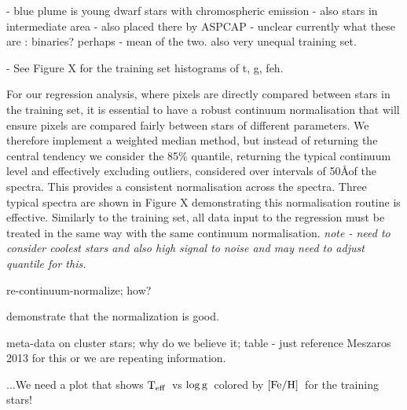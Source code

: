 \documentclass[12pt, preprint]{aastex}
\newcommand{\teff}{\mbox{$\rm T_{eff}$}}
\newcommand{\feh}{\mbox{$\rm [Fe/H]$}}
\newcommand{\logg}{\mbox{$\rm \log g$}}
\begin{document}
- blue plume is young dwarf stars with chromospheric emission
- also stars in intermediate area - also placed there by ASPCAP - unclear currently what these are : binaries? perhaps - mean of the two. also very unequal training set. 

- See Figure X for the training set histograms of t, g, feh. 

For our regression analysis, where pixels are directly compared between stars in the training set, it is essential to have a robust continuum normalisation that will ensure pixels are compared fairly between stars of different parameters. We therefore implement a weighted median method, but instead of returning the central tendency we consider the 85\% quantile, returning the typical continuum level and effectively excluding outliers, considered over intervals of 50\AA of the spectra. This provides a consistent normalisation across the spectra. Three typical spectra are shown in Figure X demonstrating this normalisation routine is effective. Similarly to the training set, all data input to the regression must be treated in the same way with the same continuum normalisation.
\textit{ note - need to consider coolest stars and also high signal to noise and may need to adjust quantile for this. }

re-continuum-normalize; how?

demonstrate that the normalization is good.

meta-data on cluster stars; why do we believe it; table - just reference Meszaros 2013 for this or we are repeating information. 

...We need a plot that shows \teff\ vs \logg\ colored by \feh\ for the training stars!
\end{document}
